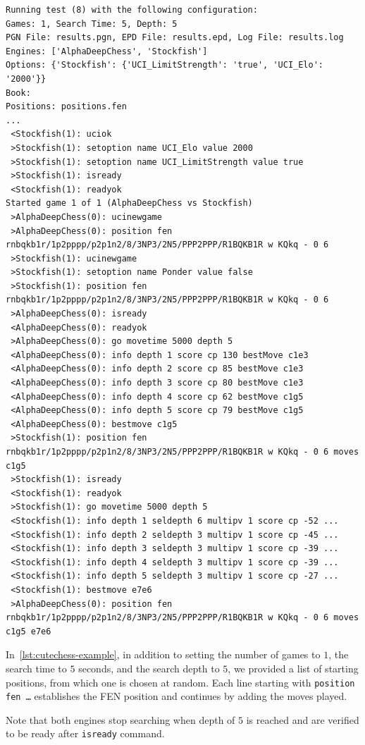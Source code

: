 \begin{lstlisting}[basicstyle=\ttfamily\scriptsize, breaklines=true, frame=single, caption={Example of \textit{Cutechess}}, label={lst:cutechess-example}]
Running test (8) with the following configuration:
Games: 1, Search Time: 5, Depth: 5
PGN File: results.pgn, EPD File: results.epd, Log File: results.log
Engines: ['AlphaDeepChess', 'Stockfish']
Options: {'Stockfish': {'UCI_LimitStrength': 'true', 'UCI_Elo': '2000'}}
Book: 
Positions: positions.fen
...
 <Stockfish(1): uciok
 >Stockfish(1): setoption name UCI_Elo value 2000
 >Stockfish(1): setoption name UCI_LimitStrength value true
 >Stockfish(1): isready
 <Stockfish(1): readyok
Started game 1 of 1 (AlphaDeepChess vs Stockfish)
 >AlphaDeepChess(0): ucinewgame
 >AlphaDeepChess(0): position fen rnbqkb1r/1p2pppp/p2p1n2/8/3NP3/2N5/PPP2PPP/R1BQKB1R w KQkq - 0 6
 >Stockfish(1): ucinewgame
 >Stockfish(1): setoption name Ponder value false
 >Stockfish(1): position fen rnbqkb1r/1p2pppp/p2p1n2/8/3NP3/2N5/PPP2PPP/R1BQKB1R w KQkq - 0 6
 >AlphaDeepChess(0): isready
 <AlphaDeepChess(0): readyok
 >AlphaDeepChess(0): go movetime 5000 depth 5
 <AlphaDeepChess(0): info depth 1 score cp 130 bestMove c1e3
 <AlphaDeepChess(0): info depth 2 score cp 85 bestMove c1e3
 <AlphaDeepChess(0): info depth 3 score cp 80 bestMove c1e3
 <AlphaDeepChess(0): info depth 4 score cp 62 bestMove c1g5
 <AlphaDeepChess(0): info depth 5 score cp 79 bestMove c1g5
 <AlphaDeepChess(0): bestmove c1g5
 >Stockfish(1): position fen rnbqkb1r/1p2pppp/p2p1n2/8/3NP3/2N5/PPP2PPP/R1BQKB1R w KQkq - 0 6 moves c1g5
 >Stockfish(1): isready
 <Stockfish(1): readyok
 >Stockfish(1): go movetime 5000 depth 5
 <Stockfish(1): info depth 1 seldepth 6 multipv 1 score cp -52 ...
 <Stockfish(1): info depth 2 seldepth 3 multipv 1 score cp -45 ...
 <Stockfish(1): info depth 3 seldepth 3 multipv 1 score cp -39 ...
 <Stockfish(1): info depth 4 seldepth 3 multipv 1 score cp -39 ...
 <Stockfish(1): info depth 5 seldepth 3 multipv 1 score cp -27 ...
 <Stockfish(1): bestmove e7e6
 >AlphaDeepChess(0): position fen rnbqkb1r/1p2pppp/p2p1n2/8/3NP3/2N5/PPP2PPP/R1BQKB1R w KQkq - 0 6 moves c1g5 e7e6
\end{lstlisting}

\noindent In~\cref{lst:cutechess-example}, in addition to setting the number of games to $1$, the search time to $5$ seconds, and the search depth to $5$, we provided a list of starting positions, from which one is chosen at random. Each line starting with \texttt{position fen \ldots} establishes the FEN position and continues by adding the moves played.

\vspace{1em}

\noindent Note that both engines stop searching when depth of $5$ is reached and are verified to be ready after \texttt{isready} command.